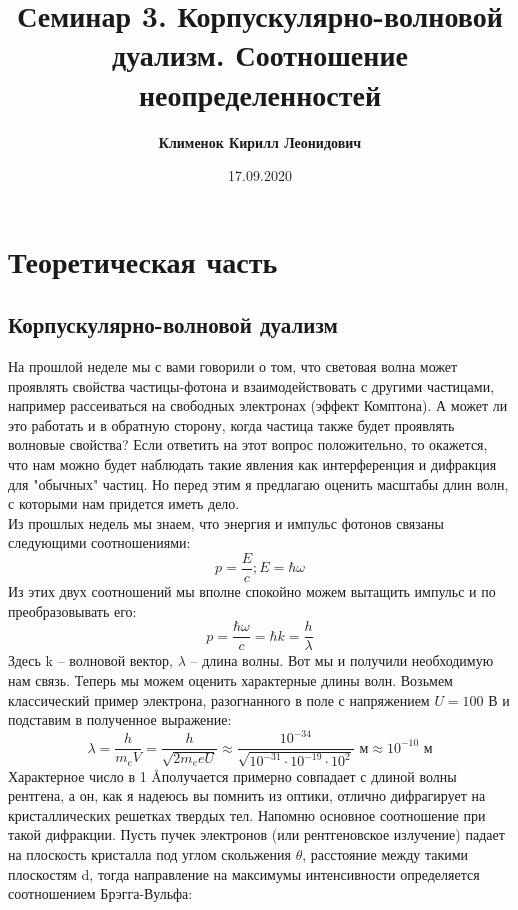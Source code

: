 \documentclass[12pt]{article}
\begin{document}
 
\title{\textbf{Семинар 3. Корпускулярно-волновой дуализм. Соотношение неопределенностей}}
\author{\textbf{Клименок Кирилл Леонидович}}
\date{17.09.2020}
\maketitle
\section{Теоретическая часть}
\subsection{Корпускулярно-волновой дуализм}
На прошлой неделе мы с вами говорили о том, что световая волна может проявлять свойства частицы-фотона и взаимодействовать с другими частицами, например рассеиваться на свободных электронах (эффект Комптона). А может ли это работать и в обратную сторону, когда частица также будет проявлять волновые свойства? Если ответить на этот вопрос положительно, то окажется, что нам можно будет наблюдать такие явления как интерференция и дифракция для "обычных" частиц. Но перед этим я предлагаю оценить масштабы длин волн, с которыми нам придется иметь дело. 
\\
Из прошлых недель мы знаем, что энергия и импульс фотонов связаны следующими соотношениями:
\begin{equation*}
    p = \dfrac{E}{c}; E = \hbar \omega
\end{equation*}
Из этих двух соотношений мы вполне спокойно можем вытащить импульс и по преобразовывать его:
\begin{equation}
    p = \dfrac{\hbar \omega}{c} = \hbar k = \dfrac{h}{\lambda}
\end{equation}
Здесь k -- волновой вектор, $\lambda$ -- длина волны. Вот мы и получили необходимую нам связь. Теперь мы можем оценить характерные длины волн. Возьмем классический пример электрона, разогнанного в поле с напряжением $U=100$ В и подставим в полученное выражение:
\begin{equation*}
    \lambda = \dfrac{h}{m_eV} = \dfrac{h}{\sqrt{2m_eeU}} \approx \dfrac{10^{-34}}{\sqrt{10^{-31}\cdot10^{-19}\cdot10^{2}}} \text{ м} \approx 10^{-10} \text{ м}
\end{equation*}
Характерное число в 1 \AA получается примерно совпадает с длиной волны рентгена, а он, как я надеюсь вы помнить из оптики, отлично дифрагирует на кристаллических решетках твердых тел. Напомню основное соотношение при такой дифракции. Пусть пучек электронов (или рентгеновское излучение) падает на плоскость кристалла под углом скольжения $\theta$, расстояние между такими плоскостям d, тогда направление на максимумы интенсивности определяется соотношением Брэгга-Вульфа: 
\end{document}

